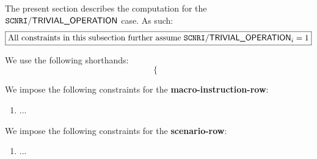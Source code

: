 



The present section describes the computation for the $\texttt{SCNRI}\textsf{/}{\textsf{TRIVIAL\_OPERATION}}$ case. As such:
\[
	\boxed{\text{All constraints in this subsection further assume } \texttt{SCNRI}\textsf{/}{\textsf{TRIVIAL\_OPERATION}}_{i} = 1}
\]

We use the following shorthands: %
\[
	\left\{ \begin{array}{lclr}
	\end{array} \right.
\]

We impose the following constraints for the \textbf{macro-instruction-row}:

\begin{enumerate}
	\item ...
\end{enumerate}

We impose the following constraints for the \textbf{scenario-row}:

\begin{enumerate}
	\item ...
\end{enumerate}


